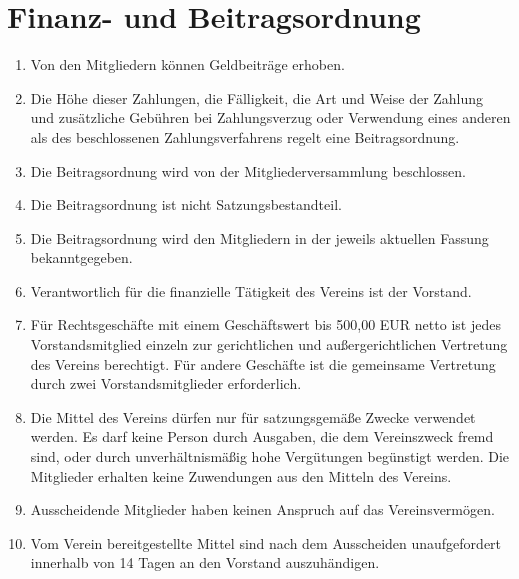 \documentclass[12pt,a4paper,draft]{article}
\begin{document}
\section{Finanz- und Beitragsordnung} %
\begin{enumerate}
\item Von den Mitgliedern können Geldbeiträge erhoben.

\item Die Höhe dieser Zahlungen, die Fälligkeit, die Art und Weise der Zahlung 
und zusätzliche Gebühren bei Zahlungsverzug oder Verwendung eines anderen als 
des beschlossenen Zahlungsverfahrens regelt eine Beitragsordnung.

\item Die Beitragsordnung wird von der Mitgliederversammlung beschlossen.

\item Die Beitragsordnung ist nicht Satzungsbestandteil.

\item Die Beitragsordnung wird den Mitgliedern in der jeweils aktuellen Fassung 
bekanntgegeben.

\item Verantwortlich für die finanzielle Tätigkeit des Vereins ist der 
Vorstand.

\item Für Rechtsgeschäfte mit einem Geschäftswert bis 500,00 EUR netto ist 
jedes Vorstandsmitglied einzeln zur gerichtlichen und außergerichtlichen 
Vertretung des Vereins berechtigt. Für andere Geschäfte ist die gemeinsame 
Vertretung durch zwei Vorstandsmitglieder erforderlich.


\item Die Mittel des Vereins dürfen nur für satzungsgemäße Zwecke verwendet 
werden. Es darf keine Person durch Ausgaben, die dem Vereinszweck fremd sind, 
oder durch unverhältnismäßig hohe Vergütungen begünstigt werden. Die Mitglieder 
erhalten keine Zuwendungen aus den Mitteln des Vereins.

\item Ausscheidende Mitglieder haben keinen Anspruch auf das Vereinsvermögen.

\item Vom Verein bereitgestellte Mittel sind nach dem Ausscheiden 
unaufgefordert innerhalb von 14 Tagen an den Vorstand auszuhändigen.


\end{enumerate}
\end{document}

